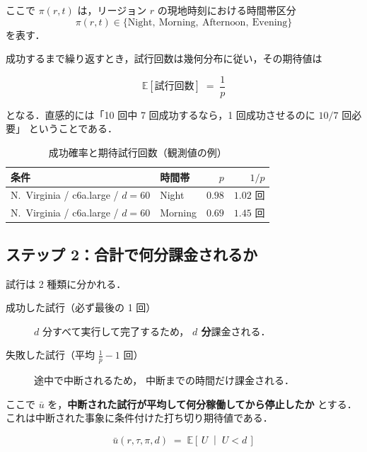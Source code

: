 \documentclass[11pt,a4paper]{ltjsarticle}
\newcommand{\E}{\mathbb{E}}
\begin{document}
ここで $\pi(r,t)$ は，リージョン $r$ の現地時刻における時間帯区分
\[
\pi(r,t) \in \{\text{Night},\ \text{Morning},\ \text{Afternoon},\ \text{Evening}\}
\]
を表す．

成功するまで繰り返すとき，試行回数は幾何分布に従い，その期待値は

\begin{equation}
\boxed{\;\E[\text{試行回数}] \;=\; \frac{1}{p}\;}
\label{eq:trials}
\end{equation}

となる．直感的には「10 回中 7 回成功するなら，1 回成功させるのに $10/7$ 回必要」
ということである．

\begin{table}[htbp]
\centering
\caption{成功確率と期待試行回数（観測値の例）}
\label{tab:trials}
\begin{tabular}{@{}llrr@{}}
\toprule
条件 & 時間帯 & $p$ & $1/p$ \\
\midrule
N.~Virginia / c6a.large / $d=60$ & Night   & $0.98$ & $1.02$ 回 \\
N.~Virginia / c6a.large / $d=60$ & Morning & $0.69$ & $1.45$ 回 \\
\bottomrule
\end{tabular}
\end{table}

\subsection{ステップ 2：合計で何分課金されるか}

試行は 2 種類に分かれる．

\begin{description}
  \item[成功した試行（必ず最後の 1 回）] $d$ 分すべて実行して完了するため，
        \textbf{$d$ 分}課金される．
  \item[失敗した試行（平均 $\frac{1}{p}-1$ 回）] 途中で中断されるため，
        中断までの時間だけ課金される．
\end{description}

ここで $\bar u$ を，\textbf{中断された試行が平均して何分稼働してから停止したか}
とする．これは中断された事象に条件付けた打ち切り期待値である．

\begin{equation}
\bar u(r,\tau,\pi,d) \;=\; \E\!\left[\,U \;\middle|\; U < d\,\right]
\label{eq:ubar}
\end{equation}
\end{document}
